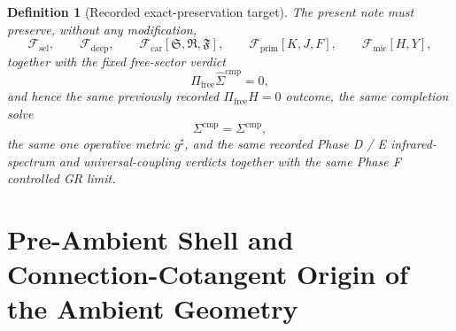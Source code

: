 \documentclass[11pt]{article}
\newcommand{\CompletedMetric}{g^{\sharp}}
\newcommand{\CompShift}{\Sigma^{\mathrm{cmp}}}
\newcommand{\CompLift}{\widehat\Sigma^{\mathrm{cmp}}}
\newcommand{\FreeProj}{\Pi_{\mathrm{free}}}
\newcommand{\GaugeAux}{Y}
\newcommand{\MicFunctional}{\mathscr F_{\mathrm{mic}}}
\newcommand{\PrimFunctional}{\mathscr F_{\mathrm{prim}}}
\newcommand{\CarrierFunctional}{\mathscr F_{\mathrm{car}}}
\newcommand{\DeepFunctional}{\mathscr F_{\mathrm{deep}}}
\newcommand{\StemFunctional}{\mathscr F_{\mathrm{sel}}}
\newcommand{\PrimStrain}{K}
\newcommand{\PrimNeutral}{J}
\newcommand{\PrimFree}{F}
\newcommand{\CarrierSeed}{\mathfrak S}
\newcommand{\RelabelSeed}{\mathfrak R}
\newcommand{\FreeSeed}{\mathfrak F}
\newtheorem{definition}{Definition}
\begin{document}
\begin{definition}[Recorded exact-preservation target]
\label{def:recorded_target}
The present note must preserve, without any modification,
\begin{equation}
\StemFunctional,
\qquad
\DeepFunctional,
\qquad
\CarrierFunctional[\CarrierSeed,\RelabelSeed,\FreeSeed],
\qquad
\PrimFunctional[\PrimStrain,\PrimNeutral,\PrimFree],
\qquad
\MicFunctional[H,\GaugeAux],
\label{eq:target_functionals}
\end{equation}
together with the fixed free-sector verdict
\begin{equation}
\FreeProj\CompLift=0,
\label{eq:target_free}
\end{equation}
and hence the same previously recorded \(\Pi_{\mathrm{free}}H=0\) outcome, the same completion solve
\begin{equation}
\CompShift=\Sigma^{\mathrm{cmp}},
\label{eq:target_sigma}
\end{equation}
the same one operative metric \(\CompletedMetric\), and the same recorded Phase D / E infrared-spectrum and universal-coupling verdicts together with the same Phase F controlled GR limit.
\end{definition}

\section{Pre-Ambient Shell and Connection-Cotangent Origin of the Ambient Geometry}
\end{document}
